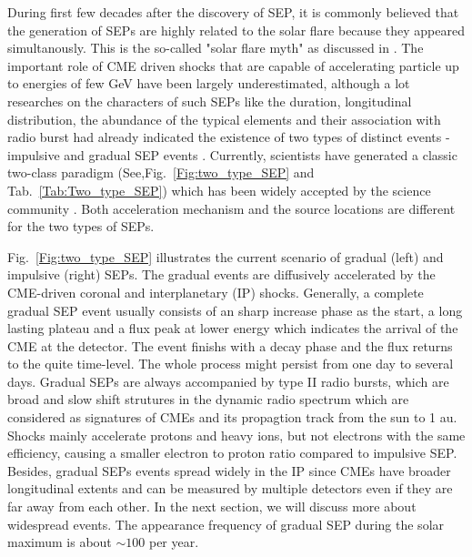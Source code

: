 During first few decades after the discovery of \ac{SEP}, it is commonly believed that the generation of \acp{SEP} are highly related to the solar flare because they appeared simultanously. This is the so-called "solar flare myth" as discussed in \citep{gosling1993the}. The important role of \ac{CME} driven shocks that are capable of accelerating particle up to energies of few GeV have been largely underestimated,
 although a lot researches on the characters of such \acp{SEP} like the duration, longitudinal distribution, the abundance of the typical elements and their association with radio burst had already indicated the existence of two types of distinct events - impulsive and gradual \ac{SEP} events \citep{kahler1978prompt,kahler1984associations,cliver1982injection,cane1986two, reames1988ApJ}.
Currently, scientists have generated a classic two-class paradigm (See,Fig.~\ref{Fig:two_type_SEP} and Tab.~\ref{Tab:Two_type_SEP}) which has been widely accepted by the science community \citep{kallenrode2003current, reames2013two,Desai_Diacalone2016LRSP, Reames2021LNP}. Both acceleration mechanism and the source locations are different for the two types of \acp{SEP}.


Fig.~\ref{Fig:two_type_SEP} illustrates the current scenario of gradual (left) and impulsive (right) \acp{SEP}.
The gradual events are diffusively accelerated by the \ac{CME}-driven coronal and interplanetary (IP) shocks. Generally, a complete gradual \ac{SEP} event usually consists of an sharp increase phase as the start, a long lasting plateau and a flux peak at lower energy which indicates the arrival of the \ac{CME} at the detector. The event finishs with a decay phase and the flux returns to the quite time-level. The whole process might persist from one day to several days. Gradual \acp{SEP} are always accompanied by type II radio bursts, which are broad and slow shift strutures in the dynamic radio spectrum which are considered as signatures of \acp{CME} and its propagtion track from the sun to 1 au. Shocks mainly accelerate protons and heavy ions, but not electrons with the same efficiency, causing a smaller electron to proton ratio compared to impulsive \ac{SEP}. Besides, gradual \acp{SEP} events spread widely in the IP since \acp{CME} have broader longitudinal extents and can be measured by multiple detectors even if they are far away from each other. In the next section, we will discuss more about widespread events. The appearance frequency of gradual \ac{SEP} during the solar maximum is about $\sim 100$ per year.

